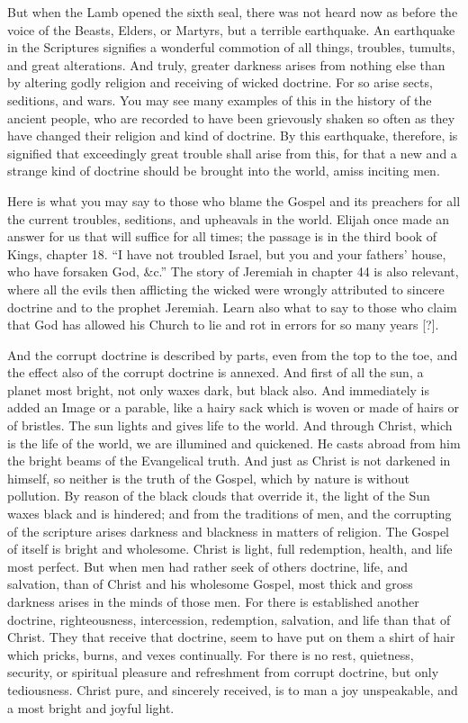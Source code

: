 But when the Lamb opened the sixth seal, there was not heard now as before the voice of the Beasts, Elders, or Martyrs, but a terrible earthquake. An earthquake in the Scriptures signifies a wonderful commotion of all things, troubles, tumults, and great alterations. And truly, greater darkness arises from nothing else than by altering godly religion and receiving of wicked doctrine. For so arise sects, seditions, and wars. You may see many examples of this in the history of the ancient people, who are recorded to have been grievously shaken so often as they have changed their religion and kind of doctrine. By this earthquake, therefore, is signified that exceedingly great trouble shall arise from this, for that a new and a strange kind of doctrine should be brought into the world, amiss inciting men.

Here is what you may say to those who blame the Gospel and its preachers for all the current troubles, seditions, and upheavals in the world. Elijah once made an answer for us that will suffice for all times; the passage is in the third book of Kings, chapter 18. “I have not troubled Israel, but you and your fathers’ house, who have forsaken God, \&c.” The story of Jeremiah in chapter 44 is also relevant, where all the evils then afflicting the wicked were wrongly attributed to sincere doctrine and to the prophet Jeremiah. Learn also what to say to those who claim that God has allowed his Church to lie and rot in errors for so many years [?].

And the corrupt doctrine is described by parts, even from the top to the toe, and the effect also of the corrupt doctrine is annexed. And first of all the sun, a planet most bright, not only waxes dark, but black also. And immediately is added an Image or a parable, like a hairy sack which is woven or made of hairs or of bristles. The sun lights and gives life to the world. And through Christ, which is the life of the world, we are illumined and quickened. He casts abroad from him the bright beams of the Evangelical truth. And just as Christ is not darkened in himself, so neither is the truth of the Gospel, which by nature is without pollution. By reason of the black clouds that override it, the light of the Sun waxes black and is hindered; and from the traditions of men, and the corrupting of the scripture arises darkness and blackness in matters of religion. The Gospel of itself is bright and wholesome. Christ is light, full redemption, health, and life most perfect. But when men had rather seek of others doctrine, life, and salvation, than of Christ and his wholesome Gospel, most thick and gross darkness arises in the minds of those men. For there is established another doctrine, righteousness, intercession, redemption, salvation, and life than that of Christ. They that receive that doctrine, seem to have put on them a shirt of hair which pricks, burns, and vexes continually. For there is no rest, quietness, security, or spiritual pleasure and refreshment from corrupt doctrine, but only tediousness. Christ pure, and sincerely received, is to man a joy unspeakable, and a most bright and joyful light.

